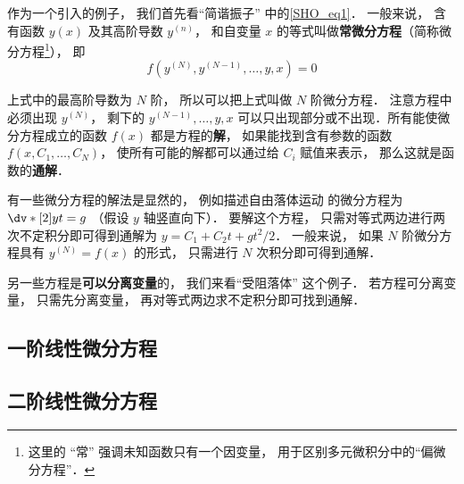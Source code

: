 

作为一个引入的例子， 我们首先看“简谐振子” 中的\autoref{SHO_eq1}． 一般来说， 含有函数 $y(x)$ 及其高阶导数 $y^{(n)}$， 和自变量 $x$ 的等式叫做\textbf{常微分方程}（简称微分方程\footnote{这里的 “常” 强调未知函数只有一个因变量， 用于区别多元微积分中的“偏微分方程”．}）， 即
\begin{equation}
f(y^{(N)}, y^{(N-1)}, \dots, y, x) = 0
\end{equation}

上式中的最高阶导数为 $N$ 阶， 所以可以把上式叫做 $N$ 阶微分方程． 注意方程中必须出现 $y^{(N)}$， 剩下的 $y^{(N-1)}, \dots, y, x$ 可以只出现部分或不出现．所有能使微分方程成立的函数 $f(x)$ 都是方程的\textbf{解}， 如果能找到含有参数的函数 $f(x,C_1, \dots , C_N)$， 使所有可能的解都可以通过给 $C_i$ 赋值来表示， 那么这就是函数的\textbf{通解}．

有一些微分方程的解法是显然的， 例如描述自由落体运动 的微分方程为 $\dv*[2]{y}{t} = g$ （假设 $y$ 轴竖直向下）． 要解这个方程， 只需对等式两边进行两次不定积分即可得到通解为 $y = C_1 + C_2 t + gt^2/2$． 一般来说， 如果 $N$ 阶微分方程具有 $y^{(N)} = f(x)$ 的形式， 只需进行 $N$ 次积分即可得到通解．

另一些方程是\textbf{可以分离变量}的， 我们来看“受阻落体” 这个例子． 若方程可分离变量， 只需先分离变量， 再对等式两边求不定积分即可找到通解．

\subsection{一阶线性微分方程}

\subsection{二阶线性微分方程}